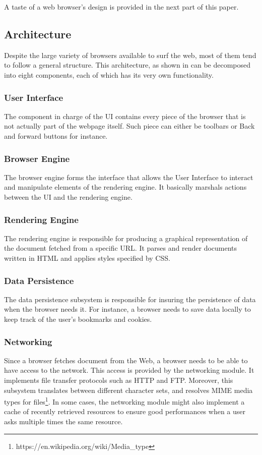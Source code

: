 \documentclass[journal]{IEEEtran}
\begin{document}
\medskip

A taste of a web browser's design is provided in the next part of this paper.

\subsection{Architecture}

Despite the large variety of browsers available to surf the web, most of them tend to follow a general structure. This architecture, as shown in \cite{architectureWebBrowsers} \cite{howBrowsersWork} can be decomposed into eight components, each of which has its very own functionality.

\subsubsection{User Interface}
The component in charge of the UI contains every piece of the browser that is not actually part of the webpage itself. Such piece can either be toolbars or Back and forward buttons for instance.

\subsubsection{Browser Engine}
The browser engine forms the interface that allows the User Interface to interact and manipulate elements of the rendering engine. It basically marshals actions between the UI and the rendering engine.

\subsubsection{Rendering Engine}
The rendering engine is responsible for producing a graphical representation of the document fetched from a specific URL. It parses and render documents written in HTML and applies styles specified by CSS.

\subsubsection{Data Persistence}
The data persistence subsystem is responsible for insuring the persistence of data when the browser needs it. For instance, a browser needs to save data locally to keep track of the user's bookmarks and cookies.

\subsubsection{Networking}
Since a browser fetches document from the Web, a browser needs to be able to have access to the network. This access is provided by the networking module. It implements file transfer protocols such as HTTP and FTP. Moreover, this subsystem translates between different character sets, and resolves MIME media types for files\footnote{https://en.wikipedia.org/wiki/Media\_type}. In some cases, the networking module might also implement a cache of recently retrieved resources to ensure good performances when a user asks multiple times the same resource.
\end{document}
